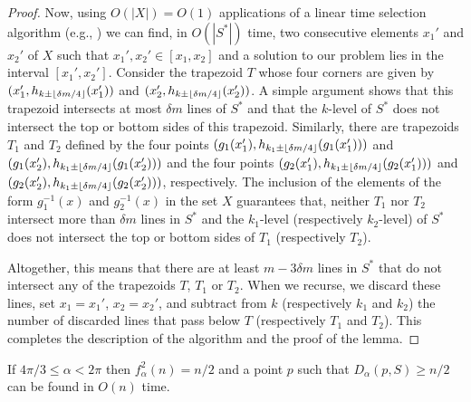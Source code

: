 \documentclass[lotsofwhite]{patmorin}
\begin{document}
\begin{proof}
Now, using $O(|X|)=O(1)$ applications of a linear time selection
algorithm (e.g., \cite{bea73}) we can 
find, in $O(|S^*|)$ time, two consecutive elements $x_1'$
and $x_2'$ of $X$ such that $x_1',x_2'\in[x_1,x_2]$ and a solution to our
problem lies in the interval $[x_1',x_2']$.  Consider the trapezoid
$T$ whose four corners are given by $(x_1',h_{k\pm\left\lfloor \delta
m/4 \right\rfloor}(x_1'))$ and $(x_2',h_{k\pm\left\lfloor \delta m/4 \right\rfloor}(x_2'))$.  A simple
argument \cite{lms94} shows that this trapezoid intersects at
most $\delta m$ lines of $S^*$ and that the $k$-level of $S^*$ does
not intersect the top or bottom sides of this trapezoid.  Similarly,
there are trapezoids $T_1$ and $T_2$ defined by the four points 
$(g_1(x_1'),h_{k_1\pm\left\lfloor \delta m/4 \right\rfloor}(g_1(x_1')))$ and
$(g_1(x_2'),h_{k_1\pm\left\lfloor \delta m/4 \right\rfloor}(g_1(x_2')))$ and the four
points
$(g_2(x_1'),h_{k_1\pm\left\lfloor \delta m/4 \right\rfloor}(g_2(x_1')))$ and
$(g_2(x_2'),h_{k_1\pm\left\lfloor \delta m/4 \right\rfloor}(g_2(x_2')))$, respectively.
The inclusion of the elements of the form $g_1^{-1}(x)$ and
$g_2^{-1}(x)$ in the set $X$ guarantees that, neither $T_1$ 
nor $T_2$ intersect more than $\delta m$ lines in $S^*$
and the $k_1$-level (respectively $k_2$-level) of $S^*$ does not
intersect the top or bottom sides of $T_1$ (respectively $T_2$).

Altogether, this means that there are at least $m-3\delta m$ lines in
$S^*$ that do not intersect any of the trapezoids $T$, $T_1$ or $T_2$.
When we recurse, we discard these lines, set $x_1=x_1'$, $x_2=x_2'$,
and subtract from $k$ (respectively $k_1$ and $k_2$) the number of
discarded lines that pass below $T$ (respectively $T_1$ and $T_2$).
This completes the description of the algorithm and the proof of the
lemma.
\end{proof}

\begin{lem}
If $4\pi/3\le \alpha < 2\pi$ then $f^2_\alpha(n) = n/2$ and a point
$p$ such that $D_\alpha(p,S)\ge n/2$ can be found in $O(n)$ time.
\end{lem}
\end{document}
